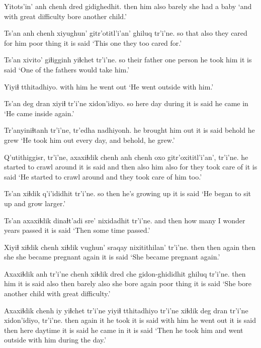 \documentclass[12pt]{article}
\begin{document}
\gll Yitots'in' anh chenh  dred  gidighedhit.
then  him also  barely  {she had a baby}
\glt `and with great difficulty bore another child.'
\glend

\gll Ts'an anh chenh {xiyughun' gitr'otitl'i'an'} ghiluq tr'i'ne.
so that also  {they cared for him} {poor thing} {it is said}
\glt `This one they too cared for.'
\glend

\gll Ts'an xivito'  giɬigginh yiɬchet  tr'i'ne.
so {their father} {one person} {he took him} {it is said}
\glt `One of the fathers would take him.'
\glend

\gll Yiyiɬ  tthitadhiyo.
{with him} {he went out}
\glt `He went outside with him.'
\glend

\gll Ts'an deg dran xiyiɬ tr'i'ne xidon'idiyo. 
so here day during {it is said} {he came in} 
\glt `He came inside again.'
\glend

\gll Tr'anyiniɬtanh tr'i'ne, tr'edha nadhiyonh.
{he brought him out} {it is said} behold  {he grew} 
\glt `He took him out every day, and behold, he grew.'
\glend

\gll Q'utithiggisr, tr'i'ne, axaxiɬdik chenh  anh chenh  oxo gitr'oxititl'i'an', tr'i'ne.
{he started to crawl around} {it is said} {and then} also  him also  for {they took care of}  {it is said}
\glt `He started to crawl around and they took care of him too.'
\glend

\gll Ts'an xiɬdik  q'i'ididhit tr'i'ne.
so then  {he's growing up} {it is said}
\glt `He began to sit up and grow larger.'
\glend

\gll Ts'an axaxiɬdik dinaɬt'adi sre'  nixidadhit tr'i'ne.
and then  {how many} {I wonder} {years passed} {it is said}
\glt `Then some time passed.'
\glend

\gll Xiyiɬ  xiɬdik  chenh xiɬdik  {vughun' sraqay nixitithilan'} tr'i'ne.
then  then  again then  {she she became pregnant again}   {it is said}
\glt `She became pregnant again.'
\glend

\gll Axaxiɬdik anh tr'i'ne chenh  xiɬdik  dred che gidon-ghididhit ghiluq tr'i'ne.
then  him {it is said} also then  barely also {she bore again}  {poor thing} {it is said}
\glt `She bore another child with great difficulty.'
\glend

\gll Axaxiɬdik chenh  iy yiɬchet tr'i'ne  yiyiɬ  tthitadhiyo tr'i'ne xiɬdik  deg dran  tr'i'ne xidon'idiyo, tr'i'ne.
then  again  it {he took}  {it is said} {with him} {he went out} {it is said} then  here daytime {it is said} {he came in}  {it is said}
\glt `Then he took him and went outside with him during the day.'
\glend
\end{document}
